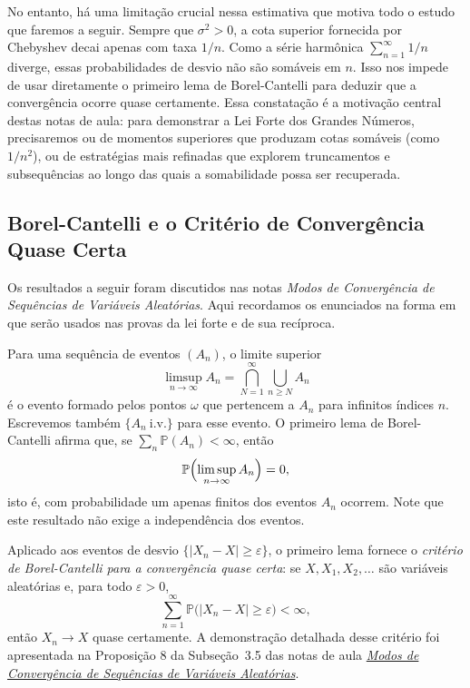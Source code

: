 \documentclass[12pt,portuguese]{article}
\theoremstyle{definition}
\theoremstyle{plainexercise}
\theoremstyle{starredexercise}
\theoremstyle{definition}
\begin{document}
No entanto, há uma limitação crucial nessa estimativa que motiva todo o estudo
que faremos a seguir. Sempre que $\sigma^2>0$, a cota superior fornecida por
Chebyshev decai apenas com taxa $1/n$. Como a série harmônica $\sum_{n=1}^\infty 1/n$
diverge, essas probabilidades de desvio não são somáveis em $n$. Isso nos impede
de usar diretamente o primeiro lema de Borel-Cantelli para deduzir que a
convergência ocorre quase certamente. Essa constatação é a motivação central
destas notas de aula: para demonstrar a Lei Forte dos Grandes Números, precisaremos
ou de momentos superiores que produzam cotas somáveis (como $1/n^2$), ou de
estratégias mais refinadas que explorem truncamentos e subsequências ao longo
das quais a somabilidade possa ser recuperada.

\subsection{Borel-Cantelli e o Critério de Convergência Quase Certa}
\label{subsec:bc-criterio}

Os resultados a seguir foram discutidos nas notas \emph{Modos de Convergência
de Sequências de Variáveis Aleatórias}. Aqui recordamos os enunciados na forma
em que serão usados nas provas da lei forte e de sua recíproca.

Para uma sequência de eventos $(A_n)$, o limite superior
\[
\limsup_{n\to\infty}A_n
=\bigcap_{N=1}^{\infty}\bigcup_{n\geqslant N}A_n
\]
é o evento formado pelos pontos $\omega$ que pertencem a $A_n$ para infinitos
índices $n$. Escrevemos também $\{A_n\ \text{i.v.}\}$ para esse
evento. O primeiro lema de Borel-Cantelli afirma que, se
$\sum_n\mathbb{P}(A_n)<\infty$, então
\[
\mathbb{P}\Bigl(\limsup_{n\to\infty}A_n\Bigr)=0,
\]
isto é, com probabilidade um apenas finitos dos eventos $A_n$ ocorrem. 
Note que este resultado não exige a independência dos eventos.

\medskip 

Aplicado aos eventos de desvio $\{|X_n-X|\geqslant\varepsilon\}$, o 
primeiro lema fornece o \emph{critério de Borel-Cantelli para a convergência quase
certa}: se $X,X_1,X_2,\ldots$ são variáveis aleatórias e, para todo
$\varepsilon>0$,
\begin{equation}\label{eq:criterio}
\sum_{n=1}^{\infty}\mathbb{P}\bigl(|X_n-X|\geqslant\varepsilon\bigr)<\infty,
\end{equation}
então $X_n\to X$ quase certamente. A demonstração detalhada desse critério
foi apresentada na Proposição 8 da Subseção~3.5 das notas de aula
\href{https://mat.unb.br/~cioletti/ensino/modos-convergencia.pdf}{\emph{Modos de Convergência
de Sequências de Variáveis Aleatórias}}.
\end{document}
